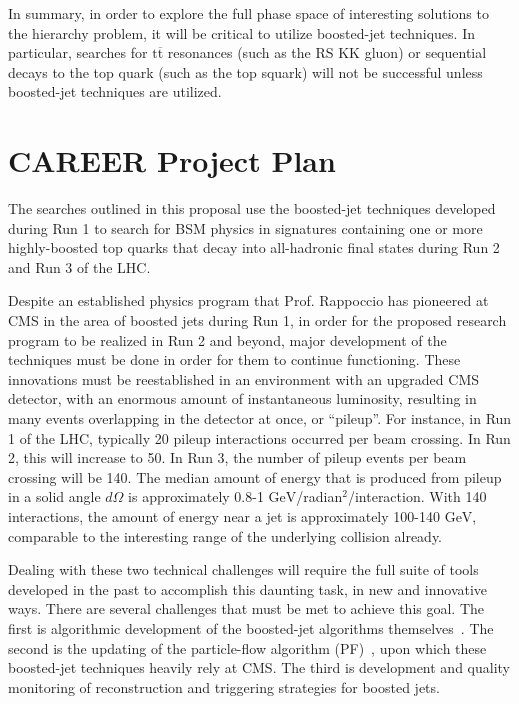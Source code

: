 \documentclass[12pt]{proposalnsf}
\newcommand{\GeV}{\ensuremath{\mathrm{GeV}}}
\newcommand{\GeVc}{\ensuremath{\mathrm{GeV}}}
\newcommand{\ttbar}        {\ensuremath{\mathrm{t}\overline{\mathrm{t}}}}
\begin{document}
In summary, in order to explore the full phase space of interesting
solutions to the hierarchy problem, it will be critical to utilize
boosted-jet techniques. In particular, searches for $\ttbar$
resonances (such as the RS KK gluon) or sequential decays to the top
quark (such as the top squark) will not be successful unless
boosted-jet techniques are utilized. 



\section{CAREER Project Plan}

The searches outlined in this proposal use the boosted-jet
techniques developed during
Run 1 to search for
BSM physics in signatures containing one or more highly-boosted
top quarks that decay into all-hadronic final states
during Run 2 and Run 3 of the LHC. 

Despite an established physics program that Prof. Rappoccio has pioneered at CMS in
the area of boosted jets during Run 1, in order for the proposed
research program to be realized in Run 2 and beyond, major development
of the techniques must be done in order for them to continue functioning. 
These innovations must be reestablished in
an environment with an upgraded CMS detector, with an enormous
amount of instantaneous luminosity, resulting in many events
overlapping in the detector at once, or ``pileup''. For instance, in
Run 1 of the LHC, typically 20 pileup interactions occurred per beam
crossing. In Run 2, this will increase to 50. In Run 3,
the number of pileup events per beam crossing will be 140. The median
amount of energy that is produced from pileup in a solid angle
$d\Omega$ is approximately 0.8-1 \GeVc/radian$^2$/interaction. With 140
interactions, the amount of energy near a jet is approximately 100-140
\GeV, comparable to the interesting range of the underlying collision
already. 

Dealing with these two technical challenges will require the full
suite of
tools developed in the past to accomplish this daunting task, in new
and innovative ways. There are several challenges that must be met to
achieve this goal. The first is algorithmic development of the
boosted-jet algorithms 
themselves~\cite{Seymour:1993mx,boostedhiggs,catop_theory,catop_cms,jetpruning1,jetpruning2,trimming,nsub}. 
The second is the updating of the particle-flow algorithm
(PF)~\cite{particleflow}, upon which these boosted-jet techniques
heavily rely at CMS. 
The third is development and quality monitoring of reconstruction and
triggering strategies for boosted jets. 
\end{document}
